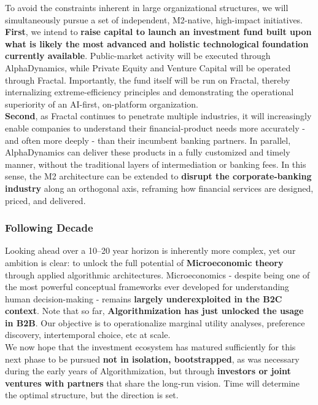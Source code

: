 \documentclass{article}
\begin{document}
To avoid the constraints inherent in large organizational structures, we will simultaneously pursue a set of independent, M2-native, high-impact initiatives.\\

\textbf{First}, we intend to \textbf{raise capital to launch an investment fund built upon what is likely the most advanced and holistic technological foundation currently available}. Public-market activity will be executed through AlphaDynamics, while Private Equity and Venture Capital will be operated through Fractal. Importantly, the fund itself will be run on Fractal, thereby internalizing extreme-efficiency principles and demonstrating the operational superiority of an AI-first, on-platform organization.\\

\textbf{Second}, as Fractal continues to penetrate multiple industries, it will increasingly enable companies to understand their financial-product needs more accurately - and often more deeply - than their incumbent banking partners. In parallel, AlphaDynamics can deliver these products in a fully customized and timely manner, without the traditional layers of intermediation or banking fees. In this sense, the M2 architecture can be extended to \textbf{disrupt the corporate-banking industry} along an orthogonal axis, reframing how financial services are designed, priced, and delivered.\\

\subsubsection{Following Decade}
\label{subsubsection: Following Decade}
Looking ahead over a 10–20 year horizon is inherently more complex, yet our ambition is clear: to unlock the full potential of \textbf{Microeconomic theory} through applied algorithmic architectures. Microeconomics - despite being one of the most powerful conceptual frameworks ever developed for understanding human decision-making - remains \textbf{largely underexploited in the B2C context}. Note that so far, \textbf{Algorithmization has just unlocked the usage in B2B}. Our objective is to operationalize marginal utility analyses, preference discovery, intertemporal choice, etc at scale.\\

We now hope that the investment ecosystem has matured sufficiently for this next phase to be pursued \textbf{not in isolation, bootstrapped}, as was necessary during the early years of Algorithmization, but through \textbf{investors or joint ventures with partners} that share the long-run vision. Time will determine the optimal structure, but the direction is set.\\
\end{document}
